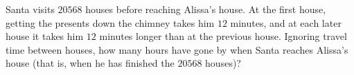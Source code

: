 Santa visits $20568$ houses before reaching Alissa's house. At the first house, getting the presents down the chimney takes him $12$ minutes, and at each later house it takes him $12$ minutes longer than at the previous house. Ignoring travel time between houses, how many hours have gone by when Santa reaches Alissa's house (that is, when he has finished the $20568$ houses)?
